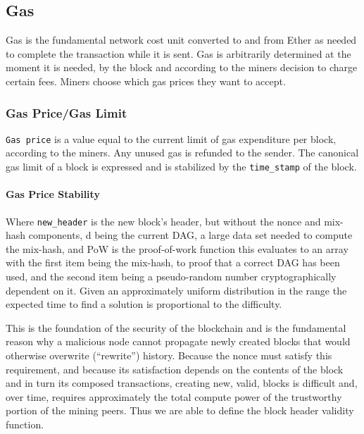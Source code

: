 \documentclass[10pt,a4paper,leqno,bibliography=totoc]{scrartcl}
\newenvironment{alphafootnotes}
{\par\edef\savedfootnotenumber{\number\value{footnote}}
\renewcommand{\thefootnote}{\alph{footnote}}
\setcounter{footnote}{0}}
{\par\setcounter{footnote}{\savedfootnotenumber}}
\begin{document}
\begin{alphafootnotes}
\begin{multicols*}{2}
				\subsection{Gas}
				Gas is the fundamental network cost unit converted to and from Ether as needed to complete the transaction while it is sent. Gas is arbitrarily determined at the moment it is needed, by the block and according to the miners decision to charge certain fees. Miners choose which gas prices they want to accept.
	
				\subsubsection{Gas Price/Gas Limit}
					\texttt{Gas price} is a value equal to the current limit of gas expenditure per block, according to the miners. Any unused gas is refunded to the sender. The canonical gas limit of a block is expressed  and is stabilized by the \texttt{time\_stamp} of the block.

				\paragraph{Gas Price Stability}
					Where \texttt{new\_header} is the new block’s header, but without the nonce and mix-hash components, d being the current DAG, a large data set needed to compute the mix-hash, and PoW is the proof-of-work function this evaluates to an array with the first item being the mix-hash, to proof that a correct DAG has been used, and the second item being a pseudo-random number cryptographically dependent on it. Given an approximately uniform distribution in the range the expected time to find a solution is proportional to the difficulty.\supercite{Wood2017} 
					
					
					This is the foundation of the security of the blockchain and is the fundamental reason why a malicious node cannot propagate newly created blocks that would otherwise overwrite (“rewrite”) history. Because the nonce must satisfy this requirement, and because its satisfaction depends on the contents of the block and in turn its composed transactions, creating new, valid, blocks is difficult and, over time, requires approximately the total compute power of the trustworthy portion of the mining peers. Thus we are able to define the block header validity function.
				

\end{multicols*}
\end{alphafootnotes}
\end{document}

